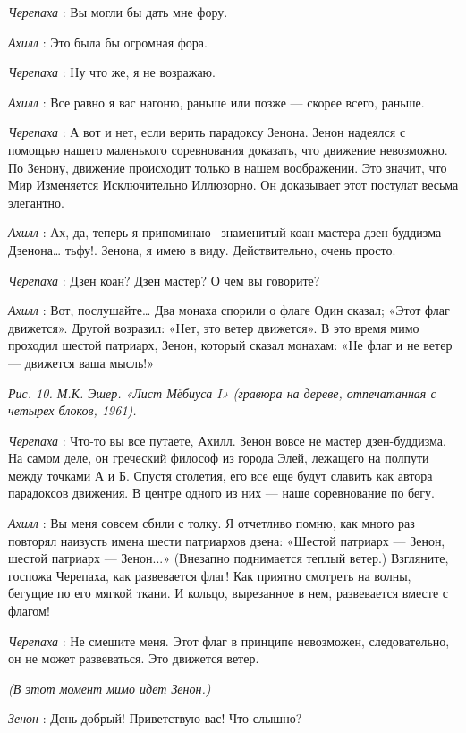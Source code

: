 \emph{Черепаха} : Вы могли бы дать мне фору.

\emph{Ахилл} : Это была бы огромная фора.

\emph{Черепаха} : Ну что же, я не возражаю.

\emph{Ахилл} : Все равно я вас нагоню, раньше или позже --- скорее всего, раньше.

\emph{Черепаха} : А вот и нет, если верить парадоксу Зенона. Зенон надеялся с помощью нашего маленького соревнования доказать, что движение невозможно. По Зенону, движение происходит только в нашем воображении. Это значит, что Мир Изменяется Исключительно Иллюзорно. Он доказывает этот постулат весьма элегантно.

\emph{Ахилл} : Ах, да, теперь я припоминаю~ знаменитый коан мастера дзен-буддизма Дзенона\ldots{} тьфу!. Зенона, я имею в виду. Действительно, очень просто.

\emph{Черепаха} : Дзен коан? Дзен мастер? О чем вы говорите?

\emph{Ахилл} : Вот, послушайте\ldots{} Два монаха спорили о флаге Один сказал; «Этот флаг движется». Другой возразил: «Нет, это ветер движется». В это время мимо проходил шестой патриарх, Зенон, который сказал монахам: «Не флаг и не ветер --- движется ваша мысль!»

\emph{Рис. 10. М.К. Эшер. «Лист Мёбиуса I» (гравюра на дереве, отпечатанная с четырех блоков, 1961).}

\emph{Черепаха} : Что-то вы все путаете, Ахилл. Зенон вовсе не мастер дзен-буддизма. На самом деле, он греческий философ из города Элей, лежащего на полпути между точками А и Б. Спустя столетия, его все еще будут славить как автора парадоксов движения. В центре одного из них --- наше соревнование по бегу.

\emph{Ахилл} : Вы меня совсем сбили с толку. Я отчетливо помню, как много раз повторял наизусть имена шести патриархов дзена: «Шестой патриарх --- Зенон, шестой патриарх --- Зенон...» (Внезапно поднимается теплый ветер.) Взгляните, госпожа Черепаха, как развевается флаг! Как приятно смотреть на волны, бегущие по его мягкой ткани. И кольцо, вырезанное в нем, развевается вместе с флагом!

\emph{Черепаха} : Не смешите меня. Этот флаг в принципе невозможен, следовательно, он не может развеваться. Это движется ветер.

\emph{(В этот момент мимо идет Зенон.)}

\emph{Зенон} : День добрый! Приветствую вас! Что слышно?

